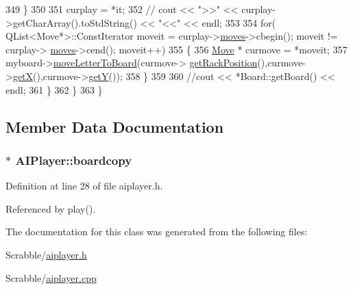 \begin{DoxyCode}
349             \}
350 
351             curplay = *it;
352             \textcolor{comment}{// cout << ">>" << curplay->getCharArray().toStdString() << "<<" << endl;}
353 
354             \textcolor{keywordflow}{for}( QList<Move*>::ConstIterator moveit = curplay->\hyperlink{class_play_ade35ae53bff24e1755a935899ee018ed}{moves}->cbegin(); moveit != curplay->
      \hyperlink{class_play_ade35ae53bff24e1755a935899ee018ed}{moves}->cend(); moveit++)
355             \{
356                 \hyperlink{class_move}{Move} * curmove = *moveit;
357                 myboard->\hyperlink{class_board_a8ed329bcdb775a910a575161ee5221ac}{moveLetterToBoard}(curmove->
      \hyperlink{class_move_ad78bb76d9b590cdb98aa4d4a3088e69d}{getRackPosition}(),curmove->\hyperlink{class_move_a7e3169f48fcca1aa1de4a5cbe67a284d}{getX}(),curmove->\hyperlink{class_move_af388d15d91f61a1f909998f50988ac1a}{getY}());
358             \}
359 
360             \textcolor{comment}{//cout << *Board::getBoard() << endl;}
361         \}
362     \}
363 \}
\end{DoxyCode}


\subsection{Member Data Documentation}
\hypertarget{class_a_i_player_a4262c0ef313e6ac9f3e5be3f2c4d6ade}{
\subsubsection[{boardcopy}]{$\ast$ A\-I\-Player\-::boardcopy\hspace{0.3cm}{\ttfamily [private]}}}\label{class_a_i_player_a4262c0ef313e6ac9f3e5be3f2c4d6ade}


Definition at line 28 of file aiplayer.\-h.



Referenced by play().



The documentation for this class was generated from the following files\-:\begin{DoxyCompactItemize}
\item 
Scrabble/\hyperlink{aiplayer_8h}{aiplayer.\-h}\item 
Scrabble/\hyperlink{aiplayer_8cpp}{aiplayer.\-cpp}\end{DoxyCompactItemize}
